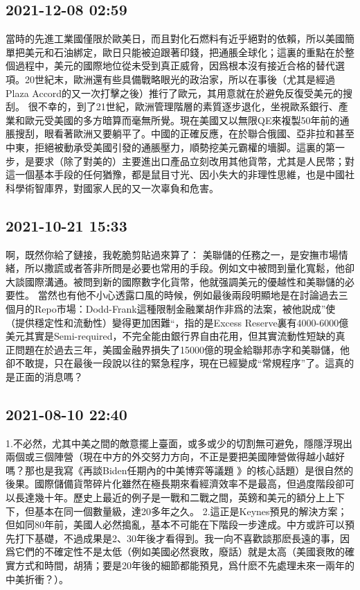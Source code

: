 \documentclass[twocolumn]{ctexart}
\begin{document}
\subsection*{2021-12-08 02:59}

當時的先進工業國僅限於歐美日，而且對化石燃料有近乎絕對的依賴，所以美國簡單把美元和石油綁定，歐日只能被迫跟著印錢，把通脹全球化；這裏的重點在於整個過程中，美元的國際地位從未受到真正威脅，因爲根本沒有接近合格的替代選項。20世紀末，歐洲還有些具備戰略眼光的政治家，所以在事後（尤其是經過Plaza Accord的又一次打擊之後）推行了歐元，其用意就在於避免反復受美元的搜刮。
很不幸的，到了21世紀，歐洲管理階層的素質逐步退化，坐視歐系銀行、產業和歐元受美國的多方暗算而毫無所覺。現在美國又以無限QE來複製50年前的通脹搜刮，眼看著歐洲又要躺平了。中國的正確反應，在於聯合俄國、亞非拉和甚至中東，拒絕被動承受美國引發的通脹壓力，順勢挖美元霸權的墻脚。這裏的第一步，是要求（除了對美的）主要進出口產品立刻改用其他貨幣，尤其是人民幣；對這一個基本手段的任何猶豫，都是鼠目寸光、因小失大的非理性思維，也是中國社科學術智庫界，對國家人民的又一次辜負和危害。
\subsection*{2021-10-21 15:33}

啊，既然你給了鏈接，我乾脆剪貼過來算了：
美聯儲的任務之一，是安撫市場情緒，所以撒謊或者答非所問是必要也常用的手段。例如文中被問到量化寬鬆，他卻大談國際溝通。被問到新的國際數字化貨幣，他就强調美元的優越性和美聯儲的必要性。
當然也有他不小心透露口風的時候，例如最後兩段明顯地是在討論過去三個月的Repo市場：Dodd-Frank這種限制金融業胡作非爲的法案，被他説成”使（提供穩定性和流動性）變得更加困難“，指的是Excess Reserve裏有4000-6000億美元其實是Semi-required，不完全能由銀行界自由花用，但其實流動性短缺的真正問題在於過去三年，美國金融界損失了15000億的現金給聯邦赤字和美聯儲，他卻不敢提，只在最後一段說以往的緊急程序，現在已經變成“常規程序”了。這真的是正面的消息嗎？
\subsection*{2021-08-10 22:40}

1.不必然，尤其中美之間的敵意擺上臺面，或多或少的切割無可避免，隱隱浮現出兩個或三個陣營（現在中方的外交努力方向，不正是要把美國陣營做得越小越好嗎？那也是我寫《再談Biden任期內的中美博弈等議題 》的核心話題）是很自然的後果。國際儲備貨幣碎片化雖然在極長期來看經濟效率不是最高，但過度階段卻可以長達幾十年。歷史上最近的例子是一戰和二戰之間，英鎊和美元的額分上上下下，但基本在同一個數量級，達20多年之久。
2.這正是Keynes預見的解決方案；但如同80年前，美國人必然搗亂，基本不可能在下階段一步達成。中方或許可以預先打下基礎，不過成果是2、30年後才看得到。我一向不喜歡談那麽長遠的事，因爲它們的不確定性不是太低（例如美國必然衰敗，廢話）就是太高（美國衰敗的確實方式和時間，胡猜；要是20年後的細節都能預見，爲什麽不先處理未來一兩年的中美折衝？）。
\end{document}
